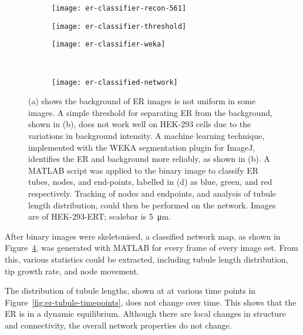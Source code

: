 \begin{figure}[htbp!]
	\centering
	\begin{subfigure}[b]{0.325\textwidth}
		\texttt{[image: er-classifier-recon-561]}
		\caption{} \label{fig:er-classifier-recon-561}
	\end{subfigure}	
	\hfill
	\begin{subfigure}[b]{0.325\textwidth}
		\texttt{[image: er-classifier-threshold]}
		\caption{} \label{fig:ER-classifier-threshold}
	\end{subfigure}	
	\hfill
	\begin{subfigure}[b]{0.325\textwidth}
		\texttt{[image: er-classifier-weka]}
		\caption{} \label{fig:ER-classifier-weka}
	\end{subfigure}	

	~\newline
	\begin{subfigure}[b]{0.8\textwidth}
		\texttt{[image: er-classified-network]}
		\caption{} \label{fig:er-classified-network}
	\end{subfigure}
	\caption[ER: WEKA segmentation allows the ER network to be extracted from a non-uniform background]{(a) shows the background of ER images is not uniform in some images. A simple threshold for separating ER from the background, shown in (b), does not work well on HEK-293 cells due to the variations in background intensity. A machine learning technique, implemented with the WEKA segmentation plugin for ImageJ, identifies the ER and background more reliably, as shown in (b). A MATLAB script was applied to the binary image to classify ER tubes, nodes, and end-points, labelled in (d) as blue, green, and red respectively. Tracking of nodes and endpoints, and analysis of tubule length distribution, could then be performed on the network. Images are of HEK-293-ERT; scalebar is \SI{5}{\micro\metre}. } 
	\label{fig:ER-classifier}
\end{figure}

After binary images were skeletonised, a classified network map, as shown in Figure~\ref{fig:er-classified-network}, was generated with MATLAB for every frame of every image set. 
From this, various statistics could be extracted, including tubule length distribution, tip growth rate, and node movement. 

The distribution of tubule lengths, shown at at various time points in Figure~\ref{fig:er-tubule-timepoints}, does not change over time. 
This shows that the ER is in a dynamic equilibrium. 
Although there are local changes in structure and connectivity, the overall network properties do not change. 

